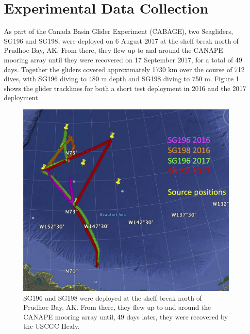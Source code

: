 \section{Experimental Data Collection}
 
 
 As part of the Canada Basin Glider Experiment (CABAGE), two Seagliders, SG196 and SG198, were deployed on 6 August 2017 at the shelf break north of Prudhoe Bay, AK. From there, they flew up to and around the CANAPE mooring array until they were recovered on 17 September 2017, for a total of 49 days.  Together the gliders covered approximately 1730 km over the course of 712 dives, with SG196 diving to 480 m depth and SG198 diving to 750 m.  Figure \ref{fig:track} shows the glider tracklines for both a short test deployment in 2016 and the 2017 deployment.

\begin{figure}%
  \centering
  \includegraphics[width=0.9\columnwidth]{./figs/GliderTrajCombined.png}%
  \caption{SG196 and SG198 were deployed at the shelf break north of Prudhoe Bay, AK.  From there, they flew up to and around the CANAPE mooring array until, 49 days later, they were recovered by the USCGC Healy.}
  \label{fig:track}
\end{figure}

